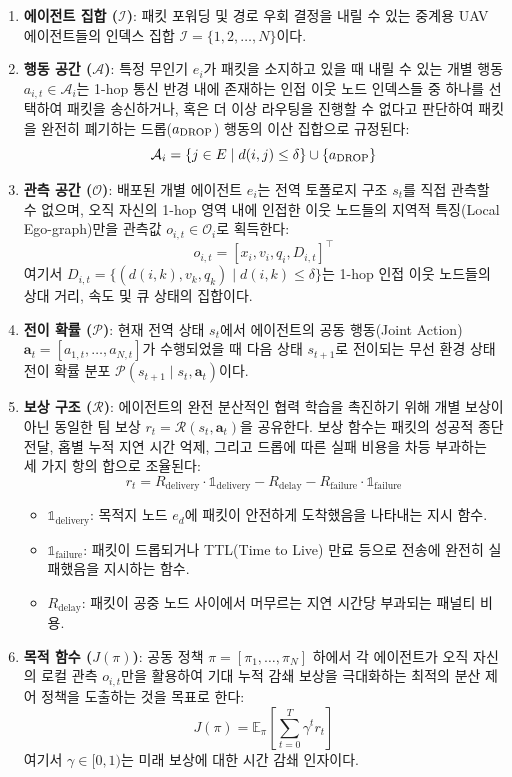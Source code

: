 \begin{enumerate}
    \item \textbf{에이전트 집합 ($\mathcal{I}$)}: 패킷 포워딩 및 경로 우회 결정을 내릴 수 있는 중계용 UAV 에이전트들의 인덱스 집합 $\mathcal{I} = \{1, 2, \dots, N\}$이다.
    
    \item \textbf{행동 공간 ($\mathcal{A}$)}: 특정 무인기 $e_i$가 패킷을 소지하고 있을 때 내릴 수 있는 개별 행동 $a_{i,t} \in \mathcal{A}_i$는 1-hop 통신 반경 내에 존재하는 인접 이웃 노드 인덱스들 중 하나를 선택하여 패킷을 송신하거나, 혹은 더 이상 라우팅을 진행할 수 없다고 판단하여 패킷을 완전히 폐기하는 드롭($a_{\mathrm{DROP}}$) 행동의 이산 집합으로 규정된다:
    \[
    \mathcal{A}_i = \{ j \in E \mid d(i,j) \le \delta \} \cup \{ a_{\mathrm{DROP}} \}
    \]
    
    \item \textbf{관측 공간 ($\mathcal{O}$)}: 배포된 개별 에이전트 $e_i$는 전역 토폴로지 구조 $s_t$를 직접 관측할 수 없으며, 오직 자신의 1-hop 영역 내에 인접한 이웃 노드들의 지역적 특징(Local Ego-graph)만을 관측값 $o_{i,t} \in \mathcal{O}_i$로 획득한다:
    \[
    o_{i,t} = [ x_i, v_i, q_i, D_{i,t} ]^\top
    \]
    여기서 $D_{i,t} = \{ (d(i,k), v_k, q_k) \mid d(i,k) \le \delta \}$는 1-hop 인접 이웃 노드들의 상대 거리, 속도 및 큐 상태의 집합이다.
    
    \item \textbf{전이 확률 ($\mathcal{P}$)}: 현재 전역 상태 $s_t$에서 에이전트의 공동 행동(Joint Action) $\mathbf{a}_t = [a_{1,t}, \dots, a_{N,t}]$가 수행되었을 때 다음 상태 $s_{t+1}$로 전이되는 무선 환경 상태 전이 확률 분포 $\mathcal{P}(s_{t+1} \mid s_t, \mathbf{a}_t)$이다.
    
    \item \textbf{보상 구조 ($\mathcal{R}$)}: 에이전트의 완전 분산적인 협력 학습을 촉진하기 위해 개별 보상이 아닌 동일한 팀 보상 $r_t = \mathcal{R}(s_t, \mathbf{a}_t)$을 공유한다. 보상 함수는 패킷의 성공적 종단 전달, 홉별 누적 지연 시간 억제, 그리고 드롭에 따른 실패 비용을 차등 부과하는 세 가지 항의 합으로 조율된다:
    \[
    r_t = R_{\mathrm{delivery}} \cdot \mathbb{1}_{\mathrm{delivery}} - R_{\mathrm{delay}} - R_{\mathrm{failure}} \cdot \mathbb{1}_{\mathrm{failure}}
    \]
    \begin{itemize}
        \item $\mathbb{1}_{\mathrm{delivery}}$: 목적지 노드 $e_d$에 패킷이 안전하게 도착했음을 나타내는 지시 함수.
        \item $\mathbb{1}_{\mathrm{failure}}$: 패킷이 드롭되거나 TTL(Time to Live) 만료 등으로 전송에 완전히 실패했음을 지시하는 함수.
        \item $R_{\mathrm{delay}}$: 패킷이 공중 노드 사이에서 머무르는 지연 시간당 부과되는 패널티 비용.
    \end{itemize}
    
    \item \textbf{목적 함수 ($J(\pi)$)}: 공동 정책 $\pi = [\pi_1, \dots, \pi_N]$ 하에서 각 에이전트가 오직 자신의 로컬 관측 $o_{i,t}$만을 활용하여 기대 누적 감쇄 보상을 극대화하는 최적의 분산 제어 정책을 도출하는 것을 목표로 한다:
    \[
    J(\pi) = \mathbb{E}_{\pi} \left[ \sum_{t=0}^{T} \gamma^t r_t \right]
    \]
    여기서 $\gamma \in [0,1)$는 미래 보상에 대한 시간 감쇄 인자이다.
\end{enumerate}
